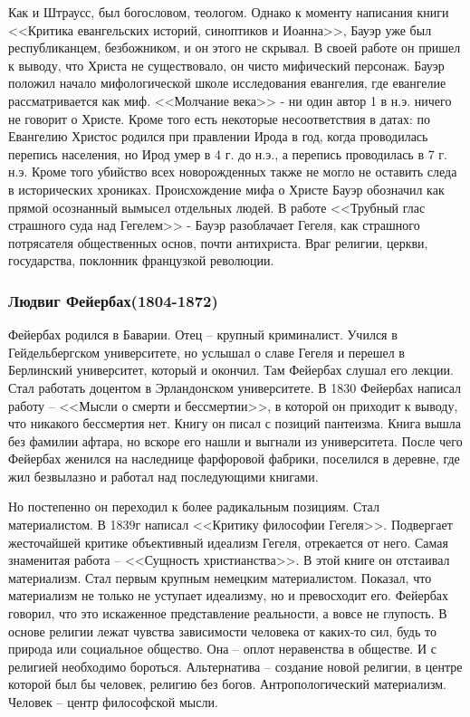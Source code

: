 Как и Штраусс, был богословом, теологом. Однако к моменту написания книги <<Критика евангельских историй, синоптиков и Иоанна>>, Бауэр уже был республиканцем, безбожником, и он этого не скрывал. В своей работе он пришел к выводу, что Христа не существовало, он чисто мифический персонаж. Бауэр положил начало мифологической школе исследования евангелия, где евангелие рассматривается как миф. <<Молчание века>> - ни один автор 1 в н.э. ничего не говорит о Христе. Кроме того есть некоторые несоответствия в датах: по Евангелию Христос родился при правлении Ирода в год, когда проводилась перепись населения, но Ирод умер в 4 г. до н.э., а перепись проводилась в 7 г. н.э. Кроме того убийство всех новорожденных также не могло не оставить следа в исторических хрониках. Происхождение мифа о Христе Бауэр обозначил как прямой осознанный вымысел отдельных людей. В работе <<Трубный глас страшного суда над Гегелем>> - Бауэр разоблачает Гегеля, как страшного потрясателя общественных основ, почти антихриста. Враг религии, церкви, государства, поклонник французкой революции.
\subsubsection{Людвиг Фейербах(1804-1872)}

Фейербах родился в Баварии. Отец – крупный криминалист. Учился в Гейдельбергском университете, но услышал о славе Гегеля и перешел в Берлинский университет, который и окончил. Там Фейербах слушал его лекции. Стал работать доцентом в Эрландонском университете. В 1830 Фейербах написал работу – <<Мысли о смерти и бессмертии>>, в которой он приходит к выводу, что никакого бессмертия нет. Книгу он писал с позиций пантеизма. Книга вышла без фамилии афтара, но вскоре его нашли и выгнали из университета. После чего Фейербах женился на наследнице фарфоровой фабрики, поселился в деревне, где жил безвылазно и работал над последующими книгами.

Но постепенно он переходил к более радикальным позициям. Стал материалистом. В 1839г написал <<Критику философии Гегеля>>. Подвергает жесточайшей критике объективный идеализм Гегеля, отрекается от него. Самая знаменитая работа – <<Сущность христианства>>. В этой книге он отстаивал материализм. Стал первым крупным немецким материалистом. Показал, что материализм не только не уступает идеализму, но и превосходит его. Фейербах говорил, что это искаженное представление реальности, а вовсе не глупость. В основе религии лежат чувства зависимости человека от каких-то сил, будь то природа или социальное общество. Она – оплот неравенства в обществе. И с религией необходимо бороться. Альтернатива – создание новой религии, в центре которой был бы человек, религию без богов. Антропологический материализм. Человек – центр философской мысли.

